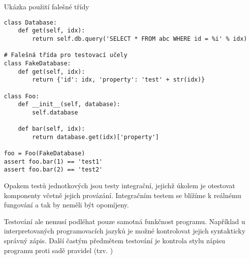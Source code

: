 \begin{listing}[ht]
\caption{\label{code:test-stub}Ukázka použití falešné třídy}
\begin{verbatim}
class Database:
    def get(self, idx):
        return self.db.query('SELECT * FROM abc WHERE id = %i' % idx)

# Falešná třída pro testovací učely
class FakeDatabase:
    def get(self, idx):
        return {'id': idx, 'property': 'test' + str(idx)}

class Foo:
    def __init__(self, database):
        self.database

    def bar(self, idx):
        return database.get(idx)['property']

foo = Foo(FakeDatabase)
assert foo.bar(1) == 'test1'
assert foo.bar(2) == 'test2'
\end{verbatim}
\end{listing}

Opakem testů jednotkových jsou testy integrační, jejichž úkolem je otestovat komponenty včetně jejich provázání.
Integračním testem se blížíme k reálnému fungování a tak by neměli být opomíjeny.

Testování ale nemusí podléhat pouze samotná funkčnost programu.
Například u interpretovaných programovacích jazyků je možné kontrolovat jejich syntakticky správný zápis.
Další častým předmětem testování je kontrola stylu zápisu programu proti sadě pravidel (tzv. )

